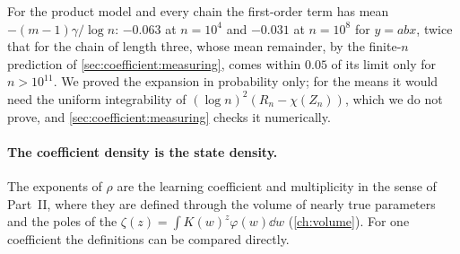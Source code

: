 \begin{refsection}
For the product model and every chain the first-order term has mean $-(m-1)\gamma/\log n$: $-0.063$ at $n=10^4$ and $-0.031$ at $n=10^8$ for $y=abx$, twice that for the chain of length three, whose mean remainder, by the finite-$n$ prediction of \cref{sec:coefficient:measuring}, comes within $0.05$ of its limit only for $n>10^{11}$. We proved the expansion in probability only; for the means it would need the uniform integrability of $(\log n)^2(R_n-\chi(Z_n))$, which we do not prove, and \cref{sec:coefficient:measuring} checks it numerically.

\paragraph{The coefficient density is the state density.} The exponents of $\rho$ are the learning coefficient and multiplicity in the sense of Part~II, where they are defined through the volume of nearly true parameters and the poles of the  $\zeta(z)=\int K(w)^z\varphi(w)\dd w$ (\cref{ch:volume}). For one coefficient the definitions can be compared directly.



\end{refsection}
